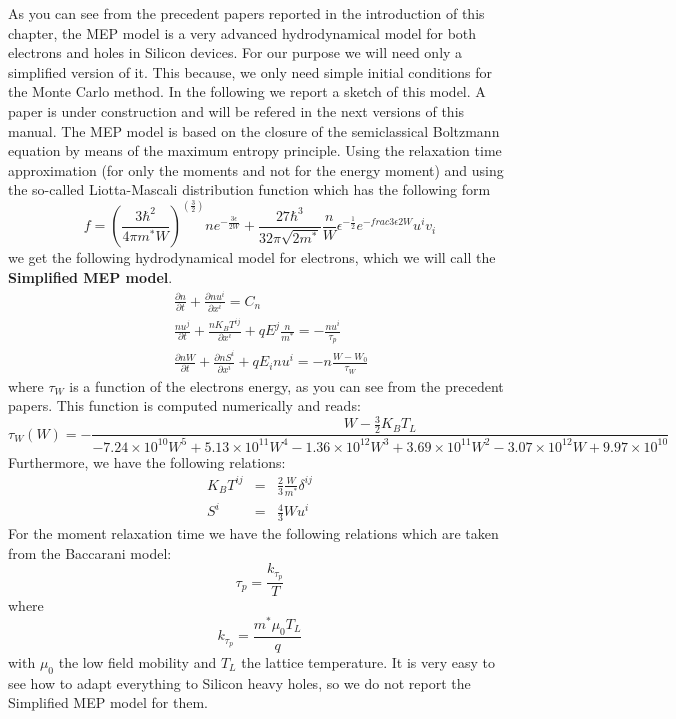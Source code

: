 \documentclass[12pt]{book}
\begin{document}
As you can see from the precedent papers reported in the introduction of this chapter, the MEP model is a very advanced hydrodynamical model for both electrons and holes in Silicon devices. For our purpose we will need only a simplified version of it. This because, we only need simple initial conditions for the Monte Carlo method. In the following we report a sketch of this model. A paper is under construction and will be refered in the next versions of this manual. The MEP model is based on the closure of the semiclassical Boltzmann equation by means of the maximum entropy principle. Using the relaxation time approximation (for only the moments and not for the energy moment) and using the so-called Liotta-Mascali distribution function which has the following form
\begin{equation}
 f = (\frac{3 \hbar^2}{4 \pi m^* W})^(\frac{3}{2}) n e^{-\frac{3 \epsilon}{2 W}} + \frac{27 \hbar^3}{32 \pi \sqrt{2 m^*}} \frac{n}{W} \epsilon^{-\frac{1}{2}} e^{-frac{3 \epsilon}{2 W}} u^i v_i
\end{equation}
we get the following hydrodynamical model for electrons, which we will call the \textbf{Simplified MEP model}.
\begin{eqnarray}
 & & \frac{\partial n}{\partial t} + \frac{\partial n u^i}{\partial x^i} = C_n\\
 & & \frac{n u^j}{\partial t} + \frac{n K_B T^{ij}}{\partial x^i} + q E^j \frac{n}{m^*} = - \frac{n u^i}{\tau_p}\\
 & & \frac{\partial n W}{\partial t} + \frac{\partial n S^i}{\partial x^i}
  + q E_i n u^i = - n \frac{W-W_0}{\tau_W}
\end{eqnarray}
where $\tau_W$ is a function of the electrons energy, as you can see from the precedent papers. This function is computed numerically and reads:
\begin{equation}
 \tau_W (W) = -\frac{W-\frac{3}{2} K_B T_L}{-7.24 \times 10^{10} W^5 + 5.13 \times 10^{11}W^4 - 1.36 \times 10^{12} W^3 + 3.69 \times 10^{11} W^2 - 3.07 \times 10^{12} W + 9.97 \times 10^{10}}
\end{equation}
Furthermore, we have the following relations:
\begin{eqnarray}
 K_B T^{ij} &=& \frac{2}{3} \frac{W}{m^*} \delta^{ij} \\
 S^i &=& \frac{4}{3} W u^i
\end{eqnarray}
For the moment relaxation time we have the following relations which are taken from the Baccarani model:
\begin{equation}
 \tau_p = \frac{k_{\tau_p}}{T}
\end{equation}
where
\begin{equation}
 k_{\tau_p} = \frac{m^* \mu_0 T_L}{q}
\end{equation}
with $\mu_0$ the low field mobility and $T_L$ the lattice temperature.
It is very easy to see how to adapt everything to Silicon heavy holes, so we do not report the Simplified MEP model for them.
\end{document}

